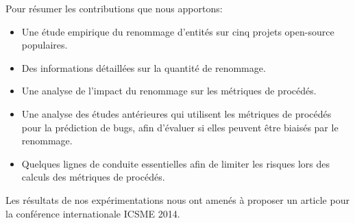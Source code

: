 Pour résumer les contributions que nous apportons:
\begin{itemize}
\item Une étude empirique du renommage d'entités sur cinq projets open-source populaires.    
\item Des informations détaillées sur la quantité de renommage.
\item Une analyse de l'impact du renommage sur les métriques de procédés.
\item Une analyse des études antérieures qui utilisent les métriques de procédés pour la prédiction de bugs, afin d'évaluer si elles peuvent être biaisés par le renommage. 
\item Quelques lignes de conduite essentielles afin de limiter les risques lors des calculs des métriques de procédés.\\
\end{itemize}


Les résultats de nos expérimentations nous ont amenés à proposer un article pour la conférence internationale ICSME 2014.

